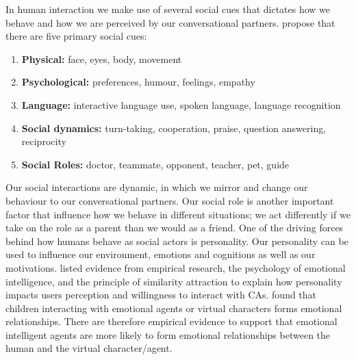 In human interaction we make use of several social cues that dictates how we behave and how we are perceived by our conversational partners. \cite{Fogg2002} propose that there are five primary social cues: 
\begin{enumerate}
    \item \textbf{Physical:} face, eyes, body, movement
    \item \textbf{Psychological:} preferences, humour, feelings, empathy
    \item \textbf{Language:} interactive language use, spoken language, language recognition
    \item \textbf{Social dynamics:} turn-taking, cooperation, praise, question answering, reciprocity
    \item \textbf{Social Roles:} doctor, teammate, opponent, teacher, pet, guide
\end{enumerate}

Our social interactions are dynamic, in which we mirror and change our behaviour to our conversational partners. Our social role is another important factor that influence how we behave in different situations; we act differently if we take on the role as a parent than we would as a friend. One of the driving forces behind how humans behave as social actors is personality. Our personality can be used to influence our environment, emotions and cognitions as well as our motivations. \cite{callejas2011} listed evidence from empirical research, the psychology of emotional intelligence, and the principle of similarity attraction to explain how personality impacts users perception and willingness to interact with CAs. \cite{Stern2003} found that children interacting with emotional agents or virtual characters forms emotional relationships. There are therefore empirical evidence to support that emotional intelligent agents are more likely to form emotional relationships between the human and the virtual character/agent. 

